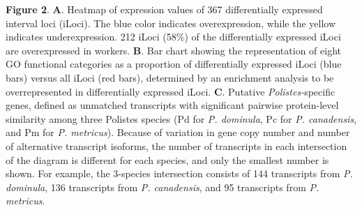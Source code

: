 \textbf{Figure 2}. \textbf{A}. Heatmap of expression values of 367
differentially expressed interval loci (iLoci). The blue color indicates
overexpression, while the yellow indicates underexpression. 212 iLoci
(58\%) of the differentially expressed iLoci are overexpressed in
workers. \textbf{B}. Bar chart showing the representation of eight GO
functional categories as a proportion of differentially expressed iLoci
(blue bars) versus all iLoci (red bars), determined by an enrichment
analysis to be overrepresented in differentially expressed iLoci.
\textbf{C}. Putative \textit{Polistes-}specific genes, defined as
unmatched transcripts with significant pairwise protein-level similarity
among three Polistes species (Pd for \textit{P. dominula}, Pc for \textit{P.
canadensis}, and Pm for \textit{P. metricus}). Because of variation in
gene copy number and number of alternative transcript isoforms, the
number of transcripts in each intersection of the diagram is different
for each species, and only the smallest number is shown. For example,
the 3-species intersection consists of 144 transcripts from \textit{P.
dominula}, 136 transcripts from \textit{P. canadensis}, and 95 transcripts
from \textit{P. metricus}.

